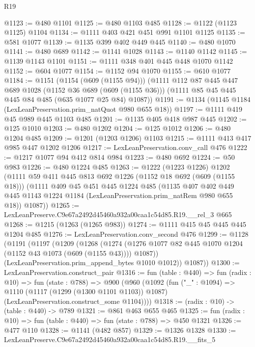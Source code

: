 \begin{lexlean}{R19}
\begin{coremodule}
@1123 := @480 @1101
@1125 := @480 @1103 @485
@1128 := @1122 (@1123 @1125) @1104
@1134 := @1111 @403 @421 @451 @991 @1101 @1125
@1135 := @581 @1077
@1139 := @1135 @399 @402 @449 @445
@1140 := @480 @1070
@1141 := @480 @689
@1142 := @1141 @1028
@1143 := @1140 @1142
@1145 := @1139 @1143 @1101
@1151 := @1111 @348 @401 @445 @448 @1070 @1142
@1152 := @604 @1077
@1154 := @1152 @94 @1070
@1155 := @610 @1077
@1184 := @1151
    (@1154 (@609 (@1155 @94)))
    (@1111
      @112
      @87
      @445
      @447
      @689
      @1028
      (@1152 @36 @689 (@609 (@1155 @36)))
      (@1111 @85 @45 @445 @445 @84 @485 (@635 @1077 @25 @84) @1087))
@1191 := @1134 (@1145 @1184 (LexLeanPreservation.prim_natQuot @980 @655 @18))
@1197 := @1111 @419 @45 @989 @445 @1103 @485
@1201 := @1135 @405 @418 @987 @445
@1202 := @125 @1010
@1203 := @480 @1202
@1204 := @125 @1012
@1206 := @480 @1204 @485
@1209 := @1201 (@1203 @1206) @1103
@1215 := @1111 @413 @417 @985 @447 @1202 @1206
@1217 := LexLeanPreservation.conv_call @476
@1222 := @1217 @1077 @94 @412 @814 @984
@1223 := @480 @692
@1224 := @50 @983
@1226 := @480 @1224 @485
@1263 := @1222
    (@1223 @1226)
    @1202
    (@1111
      @59
      @411
      @445
      @813
      @692
      @1226
      (@1152 @18 @692 (@609 (@1155 @18)))
      (@1111
        @409
        @45
        @451
        @445
        @1224
        @485
        (@1135
          @407
          @402
          @449
          @445
          @1143
          @1224
          @1184
          (LexLeanPreservation.prim_natRem @980 @655 @18))
        @1087))
@1265 := LexLeanPreserve.C9e67a2492d45460a932a00caa1c54d85.R19.__rel_3 @665
@1268 := @1215 (@1263 (@1265 @983))
@1274 := @1111 @415 @45 @445 @445 @1204 @485
@1276 := LexLeanPreservation.conv_second @476
@1299 := @1128
    (@1191
      (@1197
        (@1209
          (@1268
            (@1274 (@1276 @1077 @82 @445 @1070 @1204 (@1152 @43 @1073 (@609 (@1155 @43)))) @1087))
          (LexLeanPreservation.prim_append_bytes @1010 @1012))
        @1087))
@1300 := LexLeanPreservation.construct_pair
@1316 := fun (table : @440) =>
  fun (radix : @10) =>
  fun (state : @788) =>
  @900
    (@960
      (@1092
        (fun ("_" : @1094) =>
        @1110
          (@1117 (@1299 (@1300 @1101 @1103)) @1087)
          (LexLeanPreservation.construct_some @1104))))
@1318 := (radix : @10) -> (table : @440) -> @789
@1321 := @861 @463 @655 @465
@1325 := fun (radix : @10) => fun (table : @440) => fun (state : @788) => @450 @1321
@1326 := @477 @110
@1328 := @1141 (@482 @857)
@1329 := @1326 @1328
@1330 := LexLeanPreserve.C9e67a2492d45460a932a00caa1c54d85.R19.__fits_5

\end{coremodule}
\end{lexlean}
